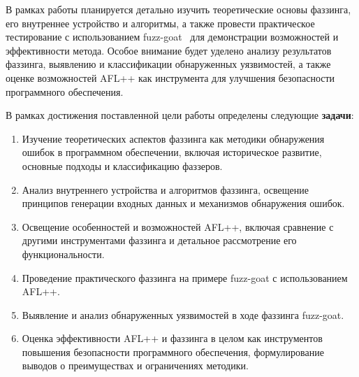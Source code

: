  В рамках работы планируется детально изучить теоретические основы фаззинга, его внутреннее устройство и алгоритмы, а также провести практическое тестирование с использованием fuzz-goat~\cite{???} для демонстрации возможностей и эффективности метода. Особое внимание будет уделено анализу результатов фаззинга, выявлению и классификации обнаруженных уязвимостей, а также оценке возможностей AFL++ как инструмента для улучшения безопасности программного обеспечения.
\par
В рамках достижения поставленной цели работы определены следующие \textbf{задачи}:
\begin{enumerate}
	\item Изучение теоретических аспектов фаззинга как методики обнаружения ошибок в программном обеспечении, включая историческое развитие, основные подходы и классификацию фаззеров.
	\item Анализ внутреннего устройства и алгоритмов фаззинга, освещение принципов генерации входных данных и механизмов обнаружения ошибок.
	\item Освещение особенностей и возможностей AFL++, включая сравнение с другими инструментами фаззинга и детальное рассмотрение его функциональности.
	\item Проведение практического фаззинга на примере fuzz-goat с использованием AFL++.
	\item Выявление и анализ обнаруженных уязвимостей в ходе фаззинга fuzz-goat.
	\item Оценка эффективности AFL++ и фаззинга в целом как инструментов повышения безопасности программного обеспечения, формулирование выводов о преимуществах и ограничениях методики.
\end{enumerate}

